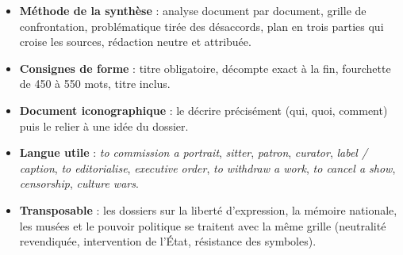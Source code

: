 \documentclass[11pt,a4paper]{article}
\providecommand{\tightlist}{\setlength{\itemsep}{0pt}\setlength{\parskip}{0pt}}
\begin{document}
\begin{itemize}
\tightlist
\item
  \textbf{Méthode de la synthèse} : analyse document par document, grille de confrontation, problématique tirée des désaccords, plan en trois parties qui croise les sources, rédaction neutre et attribuée.
\item
  \textbf{Consignes de forme} : titre obligatoire, décompte exact à la fin, fourchette de 450 à 550 mots, titre inclus.
\item
  \textbf{Document iconographique} : le décrire précisément (qui, quoi, comment) puis le relier à une idée du dossier.
\item
  \textbf{Langue utile} : \emph{to commission a portrait}, \emph{sitter}, \emph{patron}, \emph{curator}, \emph{label / caption}, \emph{to editorialise}, \emph{executive order}, \emph{to withdraw a work}, \emph{to cancel a show}, \emph{censorship}, \emph{culture wars}.
\item
  \textbf{Transposable} : les dossiers sur la liberté d'expression, la mémoire nationale, les musées et le pouvoir politique se traitent avec la même grille (neutralité revendiquée, intervention de l'État, résistance des symboles).
\end{itemize}
\end{document}
